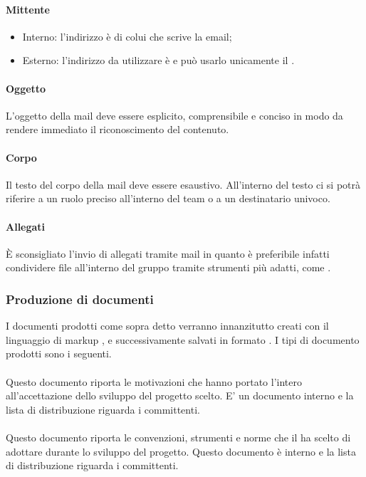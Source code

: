 \paragraph{Mittente}
\begin{itemize}
  \item Interno: l'indirizzo è di colui che scrive la email;
  \item Esterno: l'indirizzo da utilizzare è \email e può usarlo unicamente il \Pm.
\end{itemize}

\paragraph{Oggetto}
L'oggetto della mail deve essere esplicito, comprensibile e conciso in modo da rendere
immediato il riconoscimento del contenuto.

\paragraph{Corpo}
Il testo del corpo della mail deve essere esaustivo. All'interno del
testo ci si potrà riferire a un ruolo preciso all'interno del team o a un destinatario univoco.

\paragraph{Allegati}
È sconsigliato l'invio di allegati tramite mail in quanto è preferibile infatti condividere file all'interno del gruppo tramite strumenti più adatti, come .

\subsubsection{Produzione di documenti}
I documenti prodotti come sopra detto verranno innanzitutto creati con il linguaggio di markup , e successivamente salvati in formato . I tipi di documento prodotti sono i seguenti.

\paragraph{\SdF}
Questo documento riporta le motivazioni che hanno portato l'intero
 all'accettazione dello sviluppo del progetto scelto. E' un documento interno e la lista di distribuzione riguarda i committenti.

\paragraph{\NdP}
Questo documento riporta le convenzioni, strumenti e
norme che il  ha scelto di adottare durante  lo sviluppo del progetto. Questo
documento è interno e la lista di distribuzione riguarda i committenti.


